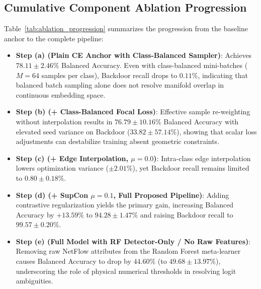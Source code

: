 \documentclass[12pt,a4paper]{report}
\begin{document}
\subsection{Cumulative Component Ablation Progression}
Table~\ref{tab:ablation_progression} summarizes the progression from the baseline anchor to the complete pipeline:
\begin{itemize}
    \item \textbf{Step (a) (Plain CE Anchor with Class-Balanced Sampler)}: Achieves $78.11 \pm 2.46\%$ Balanced Accuracy. Even with class-balanced mini-batches ($M = 64$ samples per class), Backdoor recall drops to $0.11\%$, indicating that balanced batch sampling alone does not resolve manifold overlap in continuous embedding space.
    \item \textbf{Step (b) (+ Class-Balanced Focal Loss)}: Effective sample re-weighting without interpolation results in $76.79 \pm 10.16\%$ Balanced Accuracy with elevated seed variance on Backdoor ($33.82 \pm 57.14\%$), showing that scalar loss adjustments can destabilize training absent geometric constraints.
    \item \textbf{Step (c) (+ Edge Interpolation, $\mu = 0.0$)}: Intra-class edge interpolation lowers optimization variance ($\pm 2.01\%$), yet Backdoor recall remains limited to $0.80 \pm 0.18\%$.
    \item \textbf{Step (d) (+ SupCon $\mu = 0.1$, Full Proposed Pipeline)}: Adding contrastive regularization yields the primary gain, increasing Balanced Accuracy by $+13.59\%$ to $94.28 \pm 1.47\%$ and raising Backdoor recall to $99.57 \pm 0.20\%$.
    \item \textbf{Step (e) (Full Model with RF Detector-Only / No Raw Features)}: Removing raw NetFlow attributes from the Random Forest meta-learner causes Balanced Accuracy to drop by $44.60\%$ (to $49.68 \pm 13.97\%$), underscoring the role of physical numerical thresholds in resolving logit ambiguities.
\end{itemize}
\end{document}
